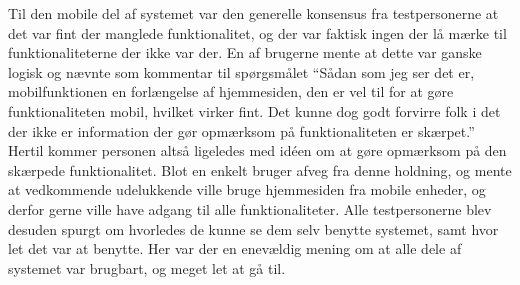 Til den mobile del af systemet var den generelle konsensus fra testpersonerne at det var fint der manglede funktionalitet, og der var faktisk ingen der lå mærke til funktionaliteterne der ikke var der. 
En af brugerne mente at dette var ganske logisk og nævnte som kommentar til spørgsmålet ``Sådan som jeg ser det er, mobilfunktionen en forlængelse af hjemmesiden, den er vel til for at gøre funktionaliteten mobil, hvilket virker fint. Det kunne dog godt forvirre folk i det der ikke er information der gør opmærksom på funktionaliteten er skærpet.''
Hertil kommer personen altså ligeledes med idéen om at gøre opmærksom på den skærpede funktionalitet.
Blot en enkelt bruger afveg fra denne holdning, og mente at vedkommende udelukkende ville bruge hjemmesiden fra mobile enheder, og derfor gerne ville have adgang til alle funktionaliteter.
Alle testpersonerne blev desuden spurgt om hvorledes de kunne se dem selv benytte systemet, samt hvor let det var at benytte.
Her var der en enevældig mening om at alle dele af systemet var brugbart, og meget let at gå til.